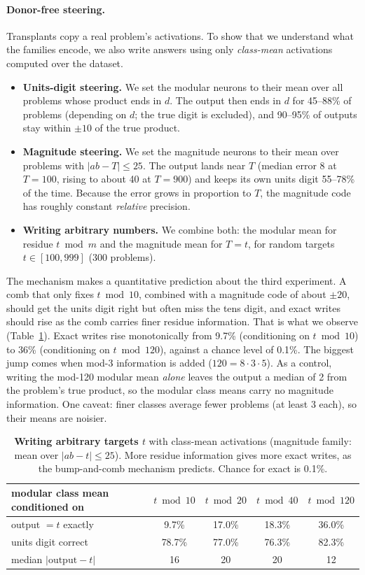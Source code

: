 \documentclass[11pt]{article}
\begin{document}
\paragraph{Donor-free steering.} Transplants copy a real problem's activations. To show that we understand what the families encode, we also write answers using only \emph{class-mean} activations computed over the dataset.
\begin{itemize}[leftmargin=1.2em,itemsep=1pt]
  \item \textbf{Units-digit steering.} We set the modular neurons to their mean over all problems whose product ends in $d$. The output then ends in $d$ for 45--88\% of problems (depending on $d$; the true digit is excluded), and 90--95\% of outputs stay within $\pm10$ of the true product.
  \item \textbf{Magnitude steering.} We set the magnitude neurons to their mean over problems with $|ab-T|\le25$. The output lands near $T$ (median error 8 at $T=100$, rising to about 40 at $T=900$) and keeps its own units digit 55--78\% of the time. Because the error grows in proportion to $T$, the magnitude code has roughly constant \emph{relative} precision.
  \item \textbf{Writing arbitrary numbers.} We combine both: the modular mean for residue $t \bmod m$ and the magnitude mean for $T=t$, for random targets $t\in[100,999]$ (300 problems).
\end{itemize}
The mechanism makes a quantitative prediction about the third experiment. A comb that only fixes $t\bmod 10$, combined with a magnitude code of about $\pm20$, should get the units digit right but often miss the tens digit, and exact writes should rise as the comb carries finer residue information. That is what we observe (Table~\ref{tab:write}). Exact writes rise monotonically from 9.7\% (conditioning on $t \bmod 10$) to 36\% (conditioning on $t \bmod 120$), against a chance level of 0.1\%. The biggest jump comes when mod-3 information is added ($120=8\cdot3\cdot5$). As a control, writing the mod-120 modular mean \emph{alone} leaves the output a median of 2 from the problem's true product, so the modular class means carry no magnitude information. One caveat: finer classes average fewer problems (at least 3 each), so their means are noisier.

\begin{table}[t]
\centering\small
\begin{tabular}{lcccc}
\toprule
modular class mean conditioned on & $t \bmod 10$ & $t\bmod 20$ & $t\bmod 40$ & $t \bmod 120$\\
\midrule
output $= t$ exactly & 9.7\% & 17.0\% & 18.3\% & 36.0\%\\
units digit correct & 78.7\% & 77.0\% & 76.3\% & 82.3\%\\
median $|\text{output}-t|$ & 16 & 20 & 20 & 12\\
\bottomrule
\end{tabular}
\caption{\textbf{Writing arbitrary targets $t$} with class-mean activations (magnitude family: mean over $|ab-t|\le25$). More residue information gives more exact writes, as the bump-and-comb mechanism predicts. Chance for exact is 0.1\%.}
\label{tab:write}
\end{table}
\end{document}
